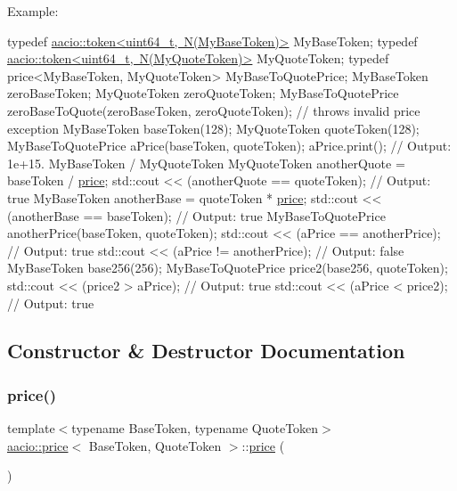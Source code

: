 Example\+: 
\begin{DoxyCode}
\textcolor{keyword}{typedef} \mbox{\hyperlink{classaacio_1_1token}{aacio::token<uint64\_t, N(MyBaseToken)>}} MyBaseToken;
\textcolor{keyword}{typedef} \mbox{\hyperlink{classaacio_1_1token}{aacio::token<uint64\_t, N(MyQuoteToken)>}} MyQuoteToken;
\textcolor{keyword}{typedef} price<MyBaseToken, MyQuoteToken> MyBaseToQuotePrice;
MyBaseToken zeroBaseToken;
MyQuoteToken zeroQuoteToken;
MyBaseToQuotePrice zeroBaseToQuote(zeroBaseToken, zeroQuoteToken); \textcolor{comment}{// throws invalid price exception}
MyBaseToken baseToken(128);
MyQuoteToken quoteToken(128);
MyBaseToQuotePrice aPrice(baseToken, quoteToken);
aPrice.print(); \textcolor{comment}{// Output: 1e+15. MyBaseToken / MyQuoteToken}
MyQuoteToken anotherQuote = baseToken / \mbox{\hyperlink{structaacio_1_1price_a007442872d7ce6ff85932b8dcb2d3524}{price}};
std::cout << (anotherQuote == quoteToken); \textcolor{comment}{// Output: true}
MyBaseToken anotherBase = quoteToken * \mbox{\hyperlink{structaacio_1_1price_a007442872d7ce6ff85932b8dcb2d3524}{price}};
std::cout << (anotherBase == baseToken); \textcolor{comment}{// Output: true}
MyBaseToQuotePrice anotherPrice(baseToken, quoteToken);
std::cout << (aPrice == anotherPrice); \textcolor{comment}{// Output: true}
std::cout << (aPrice != anotherPrice); \textcolor{comment}{// Output: false}
MyBaseToken base256(256);
MyBaseToQuotePrice price2(base256, quoteToken);
std::cout << (price2 > aPrice); \textcolor{comment}{// Output: true}
std::cout << (aPrice < price2); \textcolor{comment}{// Output: true}
\end{DoxyCode}
 

\subsection{Constructor \& Destructor Documentation}
\mbox{\label{structaacio_1_1price_a007442872d7ce6ff85932b8dcb2d3524}} 
\subsubsection{\texorpdfstring{price()}{price()}\hspace{0.1cm}{\footnotesize\ttfamily [1/2]}}
{\footnotesize\ttfamily template$<$typename Base\+Token, typename Quote\+Token$>$ \\
\mbox{\hyperlink{structaacio_1_1price}{aacio\+::price}}$<$ Base\+Token, Quote\+Token $>$\+::\mbox{\hyperlink{structaacio_1_1price}{price}} (\begin{DoxyParamCaption}{ }\end{DoxyParamCaption})\hspace{0.3cm}{\ttfamily [inline]}}



